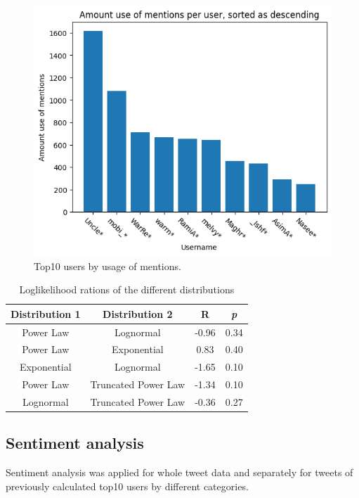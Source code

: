 \documentclass[conference]{IEEEtran}
\begin{document}
\begin{figure}
\includegraphics[scale=0.6]{figures/amount_mentions_user}
\caption{Top10 users by usage of mentions.}
\label{fig:amount-mentions-user}
\end{figure}
\begin{table}
    \begin{tabular}{ |c|c|c|c|}
        \hline
        Distribution 1 & Distribution 2 & R & \textit{p} \\
        \hline
        Power Law & Lognormal & -0.96 & 0.34 \\
        \hline
        Power Law & Exponential & 0.83 & 0.40 \\
        \hline
        Exponential & Lognormal & -1.65 & 0.10 \\
        \hline
        Power Law & Truncated Power Law & -1.34 & 0.10 \\
        \hline
        Lognormal & Truncated Power Law & -0.36 & 0.27 \\
        \hline
    \end{tabular}
    \caption{Loglikelihood rations of the different distributions}
    \label{tab:powerlaw}
\end{table}

\subsection{Sentiment analysis}
Sentiment analysis was applied for whole tweet data and separately for tweets of previously calculated top10 users by different categories.
\end{document}
